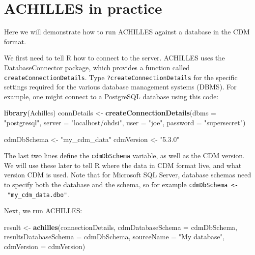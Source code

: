\documentclass[11pt]{book}
\newenvironment{Shaded}{\begin{snugshade}}{\end{snugshade}}
\newcommand{\DataTypeTok}[1]{\textcolor[rgb]{0.13,0.29,0.53}{#1}}
\newcommand{\KeywordTok}[1]{\textcolor[rgb]{0.13,0.29,0.53}{\textbf{#1}}}
\newcommand{\NormalTok}[1]{#1}
\newcommand{\StringTok}[1]{\textcolor[rgb]{0.31,0.60,0.02}{#1}}
\theoremstyle{definition}
\theoremstyle{definition}
\theoremstyle{definition}
\theoremstyle{remark}
\begin{document}
\hypertarget{achillesInPractice}{%
\section{ACHILLES in practice}\label{achillesInPractice}}

Here we will demonstrate how to run ACHILLES against a database in the CDM format.

We first need to tell R how to connect to the server. ACHILLES uses the \href{https://ohdsi.github.io/DatabaseConnector/}{DatabaseConnector} package, which provides a function called \texttt{createConnectionDetails}. Type \texttt{?createConnectionDetails} for the specific settings required for the various database management systems (DBMS). For example, one might connect to a PostgreSQL database using this code:

\begin{Shaded}
\begin{Highlighting}[]
\KeywordTok{library}\NormalTok{(Achilles)}
\NormalTok{connDetails <-}\StringTok{ }\KeywordTok{createConnectionDetails}\NormalTok{(}\DataTypeTok{dbms =} \StringTok{"postgresql"}\NormalTok{,}
                                       \DataTypeTok{server =} \StringTok{"localhost/ohdsi"}\NormalTok{,}
                                       \DataTypeTok{user =} \StringTok{"joe"}\NormalTok{,}
                                       \DataTypeTok{password =} \StringTok{"supersecret"}\NormalTok{)}

\NormalTok{cdmDbSchema <-}\StringTok{ "my_cdm_data"}
\NormalTok{cdmVersion <-}\StringTok{ "5.3.0"}
\end{Highlighting}
\end{Shaded}

The last two lines define the \texttt{cdmDbSchema} variable, as well as the CDM version. We will use these later to tell R where the data in CDM format live, and what version CDM is used. Note that for Microsoft SQL Server, database schemas need to specify both the database and the schema, so for example \texttt{cdmDbSchema\ \textless{}-\ "my\_cdm\_data.dbo"}.

Next, we run ACHILLES:

\begin{Shaded}
\begin{Highlighting}[]
\NormalTok{result <-}\StringTok{ }\KeywordTok{achilles}\NormalTok{(connectionDetails,}
                   \DataTypeTok{cdmDatabaseSchema =}\NormalTok{ cdmDbSchema,}
                   \DataTypeTok{resultsDatabaseSchema =}\NormalTok{ cdmDbSchema,}
                   \DataTypeTok{sourceName =} \StringTok{"My database"}\NormalTok{,}
                   \DataTypeTok{cdmVersion =}\NormalTok{ cdmVersion)}
\end{Highlighting}
\end{Shaded}
\end{document}
